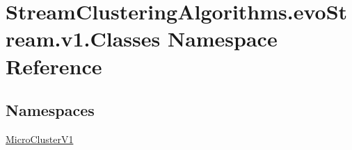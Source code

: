 \hypertarget{namespaceStreamClusteringAlgorithms_1_1evoStream_1_1v1_1_1Classes}{}\section{Stream\+Clustering\+Algorithms.\+evo\+Stream.\+v1.\+Classes Namespace Reference}
\label{namespaceStreamClusteringAlgorithms_1_1evoStream_1_1v1_1_1Classes}
\subsection*{Namespaces}
\begin{DoxyCompactItemize}
\item 
 \hyperlink{namespaceStreamClusteringAlgorithms_1_1evoStream_1_1v1_1_1Classes_1_1MicroClusterV1}{Micro\+Cluster\+V1}
\end{DoxyCompactItemize}
